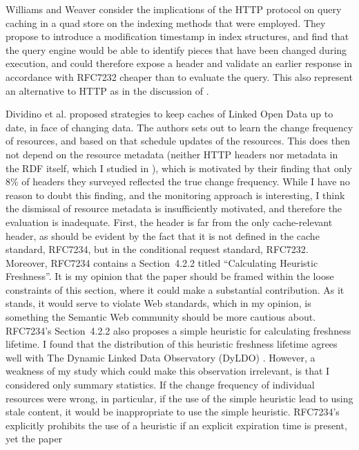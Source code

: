 Williams and Weaver \cite{kaseicache} consider the implications of the
HTTP protocol on query caching in a quad store on the indexing methods
that were employed. They propose to introduce a modification timestamp
in index structures, and find that the query engine would be able to
identify pieces that have been changed during execution, and could
therefore expose a  header and validate an
earlier response in accordance with RFC7232 \cite{rfc7232} cheaper
than to evaluate the query. This also represent an alternative to HTTP
 as in the discussion of \cite{papailiou2015graph}.

Dividino et al. \cite{Dividino2015} proposed strategies to keep caches
of Linked Open Data up to date, in face of changing data. The authors
sets out to learn the change frequency of resources, and based on that
schedule updates of the resources. This does then not depend on the
resource metadata (neither HTTP headers nor metadata in the RDF
itself, which I studied in \cite{kjernsmo_survey_2015}), which is
motivated by their finding that only 8\% of 
headers they surveyed reflected the true change frequency. While I
have no reason to doubt this finding, and the monitoring approach is
interesting, I think the dismissal of resource metadata is
insufficiently motivated, and therefore the evaluation is
inadequate. First, the  header is far from the
only cache-relevant header, as should be evident by the fact that it
is not defined in the cache standard, RFC7234, but in the conditional
request standard, RFC7232. Moreover, RFC7234 contains a Section~4.2.2
titled ``Calculating Heuristic Freshness''. It is my opinion that the
paper should be framed within the loose constraints of this section,
where it could make a substantial contribution. As it stands, it would
serve to violate Web standards, which in my opinion, is something the
Semantic Web community should be more cautious about. RFC7234's
Section~4.2.2 also proposes a simple heuristic for calculating
freshness lifetime. I found that the distribution of this heuristic
freshness lifetime agrees well with The Dynamic Linked Data
Observatory (DyLDO) \cite{dyldo2}. However, a weakness of my study
which could make this observation irrelevant, is that I considered
only summary statistics. If the change frequency of individual
resources were wrong, in particular, if the use of the simple
heuristic lead to using stale content, it would be inappropriate to
use the simple heuristic.  RFC7234's explicitly prohibits the use of a
heuristic if an explicit expiration time is present, yet the paper
